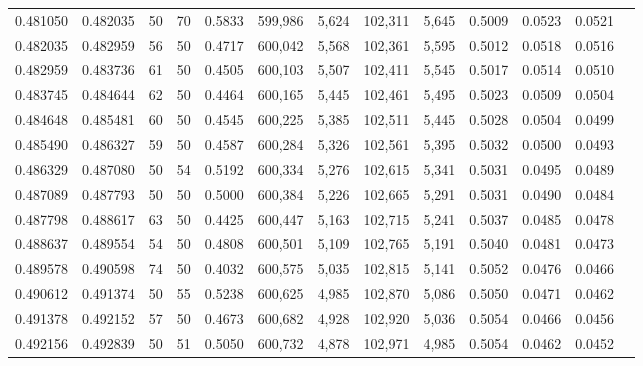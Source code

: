 \begin{tabular}{rrrrrrrrrrrrr}
0.481050 & 0.482035 &    50 &  70 &                                     0.5833 & 599,986 &   5,624 & 102,311 &   5,645 & 0.5009 & 0.0523 & 0.0521 \\
0.482035 & 0.482959 &    56 &  50 &                                     0.4717 & 600,042 &   5,568 & 102,361 &   5,595 & 0.5012 & 0.0518 & 0.0516 \\
0.482959 & 0.483736 &    61 &  50 &                                     0.4505 & 600,103 &   5,507 & 102,411 &   5,545 & 0.5017 & 0.0514 & 0.0510 \\
0.483745 & 0.484644 &    62 &  50 &                                     0.4464 & 600,165 &   5,445 & 102,461 &   5,495 & 0.5023 & 0.0509 & 0.0504 \\
0.484648 & 0.485481 &    60 &  50 &                                     0.4545 & 600,225 &   5,385 & 102,511 &   5,445 & 0.5028 & 0.0504 & 0.0499 \\
0.485490 & 0.486327 &    59 &  50 &                                     0.4587 & 600,284 &   5,326 & 102,561 &   5,395 & 0.5032 & 0.0500 & 0.0493 \\
0.486329 & 0.487080 &    50 &  54 &                                     0.5192 & 600,334 &   5,276 & 102,615 &   5,341 & 0.5031 & 0.0495 & 0.0489 \\
0.487089 & 0.487793 &    50 &  50 &                                     0.5000 & 600,384 &   5,226 & 102,665 &   5,291 & 0.5031 & 0.0490 & 0.0484 \\
0.487798 & 0.488617 &    63 &  50 &                                     0.4425 & 600,447 &   5,163 & 102,715 &   5,241 & 0.5037 & 0.0485 & 0.0478 \\
0.488637 & 0.489554 &    54 &  50 &                                     0.4808 & 600,501 &   5,109 & 102,765 &   5,191 & 0.5040 & 0.0481 & 0.0473 \\
0.489578 & 0.490598 &    74 &  50 &                                     0.4032 & 600,575 &   5,035 & 102,815 &   5,141 & 0.5052 & 0.0476 & 0.0466 \\
0.490612 & 0.491374 &    50 &  55 &                                     0.5238 & 600,625 &   4,985 & 102,870 &   5,086 & 0.5050 & 0.0471 & 0.0462 \\
0.491378 & 0.492152 &    57 &  50 &                                     0.4673 & 600,682 &   4,928 & 102,920 &   5,036 & 0.5054 & 0.0466 & 0.0456 \\
0.492156 & 0.492839 &    50 &  51 &                                     0.5050 & 600,732 &   4,878 & 102,971 &   4,985 & 0.5054 & 0.0462 & 0.0452 \\

\end{tabular}
